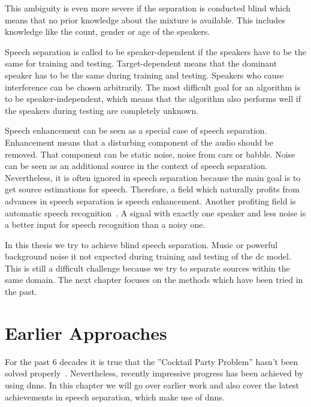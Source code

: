 This ambiguity is even more severe if the separation is conducted blind which means that no prior knowledge about the mixture is  available. This includes knowledge like the count, gender or age of the speakers.

Speech separation is called to be speaker-dependent if the speakers have to be the same for training and testing. Target-dependent means that the dominant speaker has to be the same during training and testing. Speakers who cause interference can be chosen arbitrarily. The most difficult goal for an algorithm is to be speaker-independent, which means that the algorithm also performs well if the speakers during testing are completely unknown.~\cite[p.~15]{Wang2018b}

Speech enhancement can be seen as a special case of speech separation. %
Enhancement means that a disturbing component of the audio should be removed. That component can be static noise, noise from cars or babble. Noise can be seen as an additional source in the context of speech separation. Nevertheless, it is often ignored in speech separation because the main goal is to get source estimations for speech.
Therefore, a field which naturally profits from advances in speech separation is speech enhancement. Another profiting field is automatic speech recognition~\cite{Qian2018}. A signal with exactly one speaker and less noise is a better input for speech recognition than a noisy one.

In this thesis we try to achieve blind speech separation. Music or powerful background noise it not expected during training and testing of the \gls{dc} model. This is still a difficult challenge because we try to separate sources within the same domain. The next chapter focuses on the methods which have been tried in the past.

\section{Earlier Approaches}\label{sec.approaches}

For the past 6 decades it is true that the ''Cocktail Party Problem'' hasn't been solved properly~\cite[p.~2]{Wang2018b}. Nevertheless, recently impressive progress has been achieved by using \glspl{dnn}. In this chapter we will go over earlier work and also cover the latest achievements in speech separation, which make use of \glspl{dnn}.

